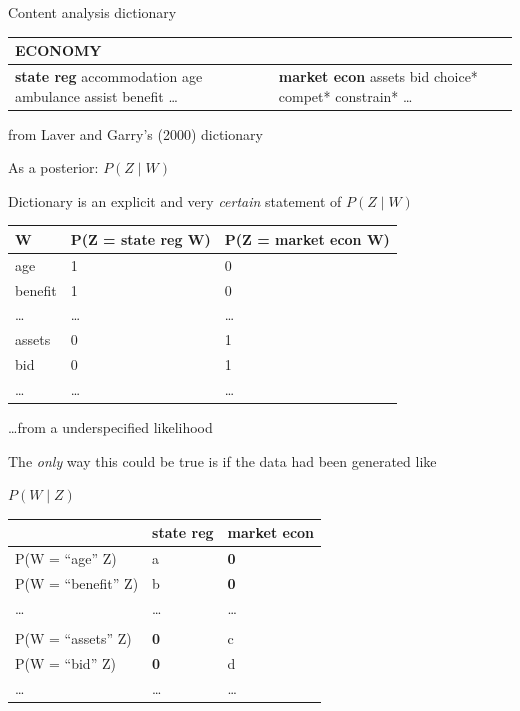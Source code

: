 \documentclass{hertieteaching}
\begin{document}
\begin{frame}{Content analysis dictionary}
\protect\hypertarget{content-analysis-dictionary}{}

\begin{longtable}[]{@{}ll@{}}
\toprule
\begin{minipage}[b]{0.21\columnwidth}\raggedright
ECONOMY\strut
\end{minipage} & \begin{minipage}[b]{0.24\columnwidth}\raggedright
\strut
\end{minipage}\tabularnewline
\midrule
\endhead
\begin{minipage}[t]{0.21\columnwidth}\raggedright
\textbf{state reg} accommodation age ambulance assist benefit
\ldots{}\strut
\end{minipage} & \begin{minipage}[t]{0.24\columnwidth}\raggedright
\textbf{market econ} assets bid choice* compet* constrain*
\ldots{}\strut
\end{minipage}\tabularnewline
\bottomrule
\end{longtable}

from Laver and Garry's (2000) dictionary

\end{frame}

\begin{frame}{As a posterior: \(P(Z \mid W)\)}
\protect\hypertarget{as-a-posterior-pz-mid-w}{}

Dictionary is an explicit and very \emph{certain} statement of
\(P(Z \mid W)\)

\begin{longtable}[]{@{}lll@{}}
\toprule
W & P(Z = state reg \textbar{} W) & P(Z = market econ \textbar{}
W)\tabularnewline
\midrule
\endhead
age & 1 & 0\tabularnewline
benefit & 1 & 0\tabularnewline
\ldots{} & \ldots{} & \ldots{}\tabularnewline
assets & 0 & 1\tabularnewline
bid & 0 & 1\tabularnewline
\ldots{} & \ldots{} & \ldots{}\tabularnewline
\bottomrule
\end{longtable}

\end{frame}

\begin{frame}{\ldots from a underspecified likelihood}
\protect\hypertarget{from-a-underspecified-likelihood}{}

The \emph{only} way this could be true is if the data had been generated
like

\(P(W \mid Z)\)

\begin{longtable}[]{@{}lll@{}}
\toprule
& state reg & market econ\tabularnewline
\midrule
\endhead
P(W = ``age'' \textbar{} Z) & a & \textbf{0}\tabularnewline
P(W = ``benefit'' \textbar{} Z) & b & \textbf{0}\tabularnewline
\ldots{} & \ldots{} & \ldots{}\tabularnewline
& &\tabularnewline
P(W = ``assets'' \textbar{} Z) & \textbf{0} & c\tabularnewline
P(W = ``bid'' \textbar{} Z) & \textbf{0} & d\tabularnewline
\ldots{} & \ldots{} & \ldots{}\tabularnewline
\bottomrule
\end{longtable}

\end{frame}
\end{document}
